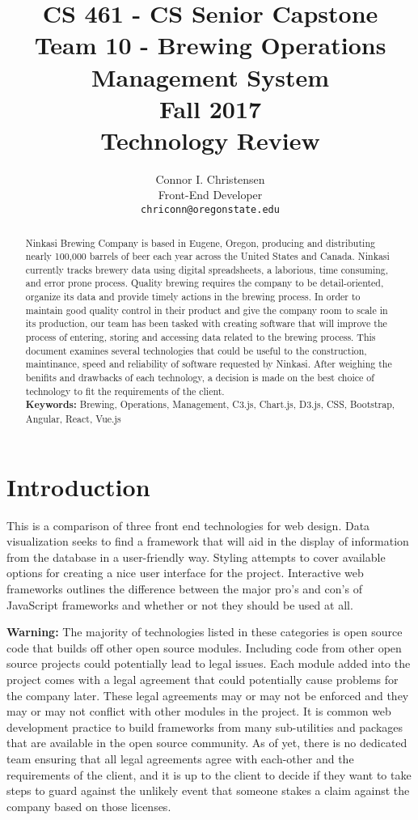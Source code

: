\documentclass[draftclsnofoot,onecolumn,letterpaper,10pt,compsoc]{IEEEtran}
\title{CS 461 - CS Senior Capstone
  \\Team 10 - Brewing Operations Management System
	\\Fall 2017
	\\Technology Review
}
\author{
	Connor I. Christensen \\
  \small{Front-End Developer} \\
	\texttt{chriconn@oregonstate.edu}
}
\begin{document}
\begin{titlingpage}
    \maketitle
    \begin{abstract}
      Ninkasi Brewing Company is based in Eugene, Oregon, producing and distributing nearly 100,000 barrels of beer each year across the United States and Canada.
      Ninkasi currently tracks brewery data using digital spreadsheets, a laborious, time consuming, and error prone process.
      Quality brewing requires the company to be detail-oriented, organize its data and provide timely actions in the brewing process.
      In order to maintain good quality control in their product and give the company room to scale in its production, our team has been tasked with creating software that will improve the process of entering, storing and accessing data related to the brewing process.
      This document examines several technologies that could be useful to the construction, maintinance, speed and reliability of software requested by Ninkasi.
      After weighing the benifits and drawbacks of each technology, a decision is made on the best choice of technology to fit the requirements of the client.
      \\
      \textbf{Keywords:} Brewing, Operations, Management, C3.js, Chart.js, D3.js, CSS, Bootstrap, Angular, React, Vue.js
    \end{abstract}
		\pagebreak
		\tableofcontents
\end{titlingpage}

\section{Introduction}

This is a comparison of three front end technologies for web design.
Data visualization seeks to find a framework that will aid in the display of information from the database in a user-friendly way.
Styling attempts to cover available options for creating a nice user interface for the project.
Interactive web frameworks outlines the difference between the major pro's and con's of JavaScript frameworks and whether or not they should be used at all.

\textbf{Warning:}
The majority of technologies listed in these categories is open source code that builds off other open source modules.
Including code from other open source projects could potentially lead to legal issues.
Each module added into the project comes with a legal agreement that could potentially cause problems for the company later.
These legal agreements may or may not be enforced and they may or may not conflict with other modules in the project.
It is common web development practice to build frameworks from many sub-utilities and packages that are available in the open source community.
As of yet, there is no dedicated team ensuring that all legal agreements agree with each-other and the requirements of the client, and it is up to the client to decide if they want to take steps to guard against the unlikely event that someone stakes a claim against the company based on those licenses.
\end{document}

